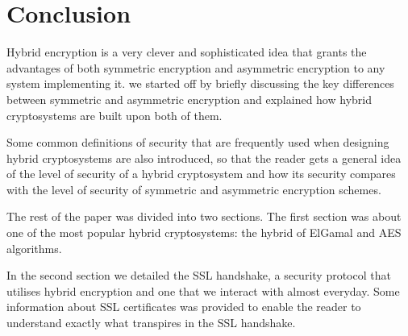 \section{Conclusion}

\label{sec:conclusion}

Hybrid encryption is a very clever and sophisticated idea that grants the advantages of both symmetric encryption and asymmetric encryption to any system implementing it. we started off by briefly discussing the key differences between symmetric and asymmetric encryption and explained how hybrid cryptosystems are built upon both of them.

Some common definitions of security that are frequently used when designing hybrid cryptosystems are also introduced, so that the reader gets a general idea of the level of security of a hybrid cryptosystem and how its security compares with the level of security  of symmetric and asymmetric encryption schemes.

The rest of the paper was divided into two sections.
The first section was about one of the most popular hybrid cryptosystems: the hybrid of ElGamal and AES algorithms.

In the second section we detailed the SSL handshake, a security protocol that utilises hybrid encryption and one that we interact with almost everyday.
Some information about SSL certificates was provided to enable the reader to understand exactly what transpires in the SSL handshake.
